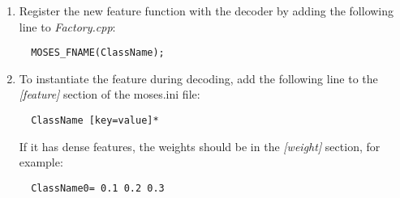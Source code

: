 \documentclass{pbml}
\begin{document}
\begin{enumerate}
    \item Register the new feature function with the decoder by adding the following line to \emph{Factory.cpp}:
      \begin{verbatim}
  MOSES_FNAME(ClassName);
      \end{verbatim}
    \item To instantiate the feature during decoding, add the following line to the \emph{[feature]} section of the moses.ini file:
      \begin{verbatim}
  ClassName [key=value]*
      \end{verbatim}
If it has dense features, the weights should be in the \emph{[weight]} section, for example:
      \begin{verbatim}
  ClassName0= 0.1 0.2 0.3
      \end{verbatim}



\end{enumerate}


\correspondingaddress
\end{document}
